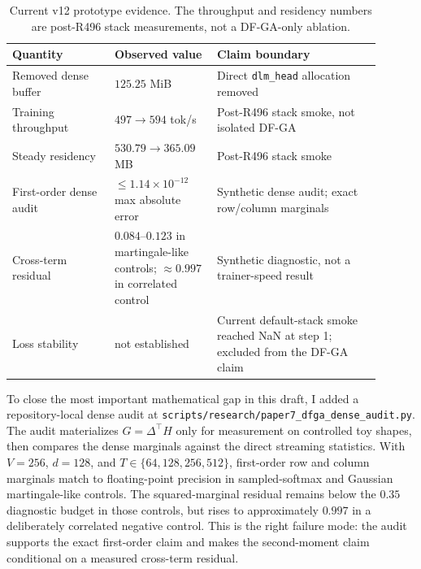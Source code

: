 \documentclass{article}
\begin{document}
\begin{table}[h]
  \centering
  \caption{Current v12 prototype evidence. The throughput and residency numbers
  are post-R496 stack measurements, not a DF-GA-only ablation.}
  \label{tab:status}
  \begin{tabular}{p{0.25\linewidth}p{0.25\linewidth}p{0.40\linewidth}}
    \toprule
    Quantity & Observed value & Claim boundary \\
    \midrule
    Removed dense buffer & $125.25$ MiB & Direct \texttt{dlm\_head} allocation removed \\
    Training throughput & $497 \rightarrow 594$ tok/s & Post-R496 stack smoke, not isolated DF-GA \\
    Steady residency & $530.79 \rightarrow 365.09$ MB & Post-R496 stack smoke \\
    First-order dense audit & $\le 1.14\times 10^{-12}$ max absolute error & Synthetic dense audit; exact row/column marginals \\
    Cross-term residual & $0.084$--$0.123$ in martingale-like controls; $\approx 0.997$ in correlated control & Synthetic diagnostic, not a trainer-speed result \\
    Loss stability & not established & Current default-stack smoke reached NaN at step 1; excluded from the DF-GA claim \\
    \bottomrule
  \end{tabular}
\end{table}

To close the most important mathematical gap in this draft, I added a
repository-local dense audit at
\texttt{scripts/research/paper7\_dfga\_dense\_audit.py}. The audit materializes
$G=\Delta^\top H$ only for measurement on controlled toy shapes, then compares
the dense marginals against the direct streaming statistics. With
$V=256$, $d=128$, and $T\in\{64,128,256,512\}$, first-order row and column
marginals match to floating-point precision in sampled-softmax and Gaussian
martingale-like controls. The squared-marginal residual remains below the
$0.35$ diagnostic budget in those controls, but rises to approximately $0.997$
in a deliberately correlated negative control. This is the right failure mode:
the audit supports the exact first-order claim and makes the second-moment
claim conditional on a measured cross-term residual.
\end{document}
